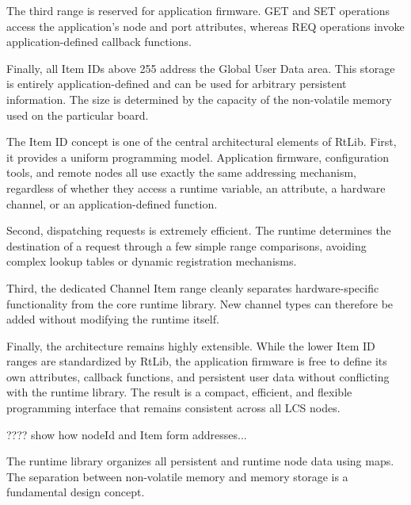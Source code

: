 The third range is reserved for application firmware. GET and SET operations 
access the application's node and port attributes, whereas REQ operations 
invoke application-defined callback functions.

Finally, all Item IDs above 255 address the Global User Data area. This storage 
is entirely application-defined and can be used for arbitrary persistent 
information. The size is determined by the capacity of the non-volatile memory used
on the particular board.


The Item ID concept is one of the central architectural elements of RtLib. 
First, it provides a uniform programming model. Application firmware, 
configuration tools, and remote nodes all use exactly the same addressing 
mechanism, regardless of whether they access a runtime variable, an attribute, 
a hardware channel, or an application-defined function. 

Second, dispatching 
requests is extremely efficient. The runtime determines the destination of a 
request through a few simple range comparisons, avoiding complex lookup tables 
or dynamic registration mechanisms. 

Third, the dedicated Channel Item range 
cleanly separates hardware-specific functionality from the core runtime library. 
New channel types can therefore be added without modifying the runtime itself.

Finally, the architecture remains highly extensible. While the lower Item ID 
ranges are standardized by RtLib, the application firmware is free to define 
its own attributes, callback functions, and persistent user data without 
conflicting with the runtime library. The result is a compact, efficient, and 
flexible programming interface that remains consistent across all LCS nodes.


???? show how nodeId and Item form addresses...



The runtime library organizes all persistent and runtime node data using maps. The
separation between non-volatile memory and memory storage is a fundamental design
concept.

